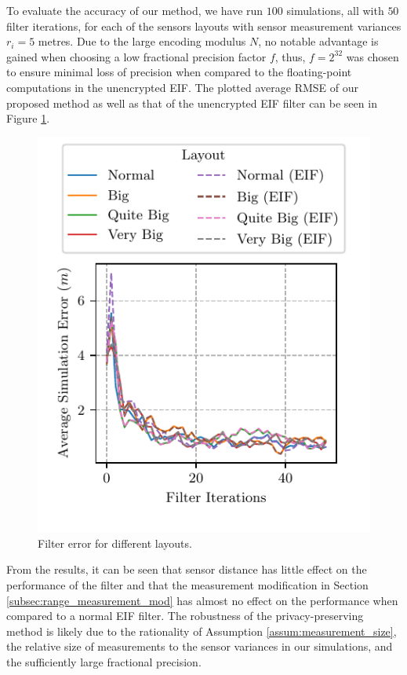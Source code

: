 \documentclass[twocolumn]{autart}
\begin{document}
To evaluate the accuracy of our method, we have run $100$ simulations, all with $50$ filter iterations, for each of the sensors layouts with sensor measurement variances $r_i=5$ metres. Due to the large encoding modulus $N$, no notable advantage is gained when choosing a low fractional precision factor $f$, thus, $f=2^{32}$ was chosen to ensure minimal loss of precision when compared to the floating-point computations in the unencrypted EIF. The plotted average RMSE of our proposed method as well as that of the unencrypted EIF filter can be seen in Figure \ref{fig:sim_layout_errors}.
\begin{figure}[htbp]
\begin{center}
    \includegraphics{images/layout_errors.pdf}
\end{center}
\caption{Filter error for different layouts.}
\label{fig:sim_layout_errors}
\end{figure}
From the results, it can be seen that sensor distance has little effect on the performance of the filter and that the measurement modification in Section \ref{subsec:range_measurement_mod} has almost no effect on the performance when compared to a normal EIF filter. The robustness of the privacy-preserving method is likely due to the rationality of Assumption \ref{assum:measurement_size}, the relative size of measurements to the sensor variances in our simulations, and the sufficiently large fractional precision.
\end{document}
